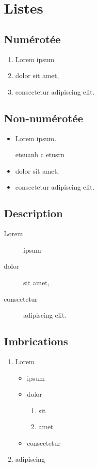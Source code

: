 \documentclass[a4paper, 11pt]{article}
\begin{document}
\clearpage
  \section{Listes}

    \subsection{Numérotée}

    \begin{enumerate}
      \item Lorem ipsum
      \item dolor sit amet,
      \item consectetur adipiscing elit.
    \end{enumerate}

    \subsection{Non-numérotée}

    \begin{itemize}
      \item Lorem ipsum.
      
      etsuanb c
      etusrn
      \item dolor sit amet,
      \item consectetur adipiscing elit.
    \end{itemize}

    \subsection{Description}

    \begin{description}
      \item[Lorem] ipsum
      \item[dolor] sit amet,
      \item[consectetur] adipiscing elit.
    \end{description}

    \subsection{Imbrications}\label{listesimbriquees}

    \begin{enumerate}
      \item Lorem
      \begin{itemize}
        \item ipsum
        \item dolor
        \begin{enumerate}
          \item sit
          \item amet
        \end{enumerate}
        \item consectetur
      \end{itemize}
      \item adipiscing
    \end{enumerate}
\end{document}
